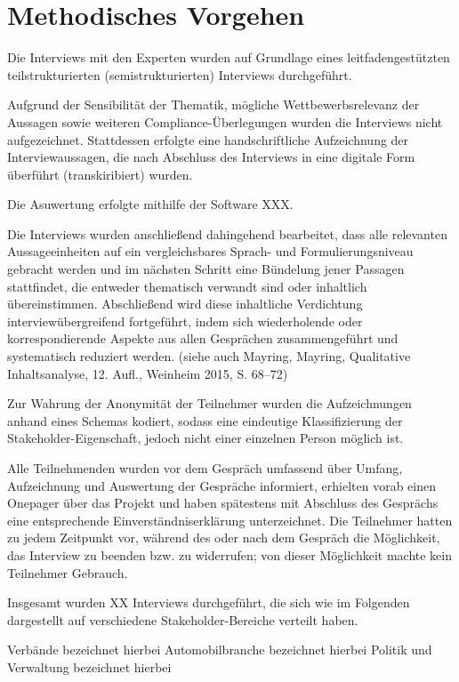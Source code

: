 \documentclass[12pt,a4paper,oneside]{book} %
\begin{document}
\section{Methodisches Vorgehen}

Die Interviews mit den Experten wurden auf Grundlage eines leitfadengestützten teilstrukturierten (semistrukturierten) Interviews durchgeführt. 

Aufgrund der Sensibilität der Thematik, mögliche Wettbewerbsrelevanz der Aussagen sowie weiteren Compliance-Überlegungen wurden die Interviews nicht aufgezeichnet. Stattdessen erfolgte eine handschriftliche Aufzeichnung der Interviewaussagen, die nach Abschluss des Interviews in eine digitale Form überführt (transkiribiert) wurden.

Die Asuwertung erfolgte mithilfe der Software XXX.

Die Interviews wurden anschließend dahingehend bearbeitet, dass alle relevanten Aussageeinheiten auf ein vergleichsbares Sprach- und Formulierungsniveau gebracht werden und im nächsten Schritt eine Bündelung jener Passagen stattfindet, die entweder thematisch verwandt sind oder inhaltlich übereinstimmen. Abschließend wird diese inhaltliche Verdichtung interviewübergreifend fortgeführt, indem sich wiederholende oder korrespondierende Aspekte aus allen Gesprächen zusammengeführt und systematisch reduziert werden. (siehe auch Mayring, Mayring, Qualitative Inhaltsanalyse, 12. Aufl., Weinheim 2015, S. 68–72)

Zur Wahrung der Anonymität der Teilnehmer wurden die Aufzeichnungen anhand eines Schemas kodiert, sodass eine eindeutige Klassifizierung der Stakeholder-Eigenschaft, jedoch nicht einer einzelnen Person möglich ist.

Alle Teilnehmenden wurden vor dem Gespräch umfassend über Umfang, Aufzeichnung und Auswertung der Gespräche informiert, erhielten vorab einen Onepager über das Projekt und haben spätestens mit Abschluss des Gesprächs eine entsprechende Einverständniserklärung unterzeichnet.
Die Teilnehmer hatten zu jedem Zeitpunkt vor, während des oder nach dem Gespräch die Möglichkeit, das Interview zu beenden bzw. zu widerrufen; von dieser Möglichkeit machte kein Teilnehmer Gebrauch.

Insgesamt wurden XX Interviews durchgeführt, die sich wie im Folgenden dargestellt auf verschiedene Stakeholder-Bereiche verteilt haben.

Verbände bezeichnet hierbei
Automobilbranche bezeichnet hierbei
Politik und Verwaltung bezeichnet hierbei
\end{document}
